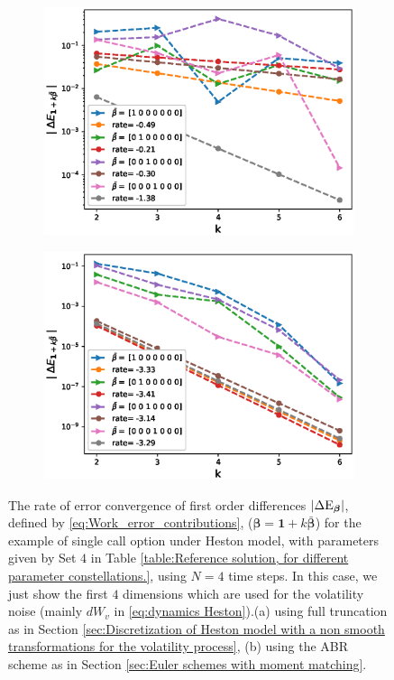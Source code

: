 \documentclass[11pt]{article}
\begin{document}
\FloatBarrier
\begin{figure}[htb]
	\centering %
	\begin{subfigure}{0.5\textwidth}
		\includegraphics[width=\linewidth]{./figures/Heston_single_call_full_truncation_vol/mixed_rates/set5/N_4/first_difference_heston_4steps_hierarchical}
		\caption{}
		\label{fig:1}
	\end{subfigure}\hfil %
	\begin{subfigure}{0.5\textwidth}
		\includegraphics[width=\linewidth]{./figures/Heston_single_call_ABR_moment_matching/mixed_rates/set5/N_4/first_difference_heston_4steps_hierarchical}
		\caption{}
		\label{fig:2}
	\end{subfigure}\hfil %
	\caption{The rate of error convergence of first order differences $\left\lvert\Delta \text{E}_{\boldsymbol{\beta}}\right\rvert$, defined by \eqref{eq:Work_error_contributions}, ($\boldsymbol{\beta}=\mathbf{1}+k \bar{\boldsymbol{\beta}}$) for the example of single call option under Heston model, with parameters given by Set $4$ in Table \ref{table:Reference solution, for different parameter constellations.}, using $N=4$ time steps. In this case, we just show  the first  $4$ dimensions which are used for the volatility noise (mainly $dW_v$ in \eqref{eq:dynamics Heston}).(a) using full truncation as in Section \ref{sec:Discretization of Heston model with a non smooth transformations for the volatility process}, (b) using the ABR scheme as in Section \ref{sec:Euler schemes with moment matching}.}

\end{figure}
\end{document}
